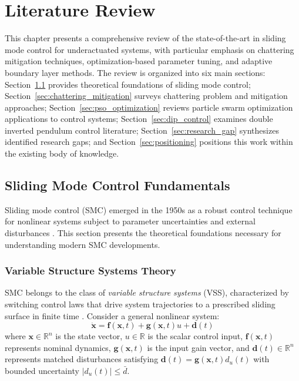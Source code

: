 \chapter{Literature Review}
\label{chap:literature_review}

This chapter presents a comprehensive review of the state-of-the-art in sliding mode control for underactuated systems, with particular emphasis on chattering mitigation techniques, optimization-based parameter tuning, and adaptive boundary layer methods. The review is organized into six main sections: Section~\ref{sec:smc_fundamentals} provides theoretical foundations of sliding mode control; Section~\ref{sec:chattering_mitigation} surveys chattering problem and mitigation approaches; Section~\ref{sec:pso_optimization} reviews particle swarm optimization applications to control systems; Section~\ref{sec:dip_control} examines double inverted pendulum control literature; Section~\ref{sec:research_gap} synthesizes identified research gaps; and Section~\ref{sec:positioning} positions this work within the existing body of knowledge.

\section{Sliding Mode Control Fundamentals}
\label{sec:smc_fundamentals}

Sliding mode control (SMC) emerged in the 1950s as a robust control technique for nonlinear systems subject to parameter uncertainties and external disturbances \cite{utkin1977variable,utkin1992sliding}. This section presents the theoretical foundations necessary for understanding modern SMC developments.

\subsection{Variable Structure Systems Theory}

SMC belongs to the class of \emph{variable structure systems} (VSS), characterized by switching control laws that drive system trajectories to a prescribed sliding surface in finite time \cite{utkin1977variable}. Consider a general nonlinear system:
\begin{equation}
\dot{\mathbf{x}} = \mathbf{f}(\mathbf{x}, t) + \mathbf{g}(\mathbf{x}, t) u + \mathbf{d}(t)
\label{eq:general_nonlinear_system}
\end{equation}
where $\mathbf{x} \in \mathbb{R}^n$ is the state vector, $u \in \mathbb{R}$ is the scalar control input, $\mathbf{f}(\mathbf{x}, t)$ represents nominal dynamics, $\mathbf{g}(\mathbf{x}, t)$ is the input gain vector, and $\mathbf{d}(t) \in \mathbb{R}^n$ represents matched disturbances satisfying $\mathbf{d}(t) = \mathbf{g}(\mathbf{x}, t) d_u(t)$ with bounded uncertainty $|d_u(t)| \leq \bar{d}$.

